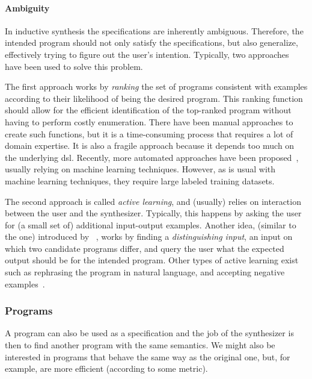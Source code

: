\paragraph{Ambiguity}
\label{sec:ambiguity}

In inductive synthesis the specifications are inherently ambiguous.
Therefore, the intended program should not only satisfy the specifications,
but also generalize, effectively trying to figure out the user's intention.
Typically, two approaches have been used to solve this problem.

The first approach works by \textit{ranking} the set of programs consistent with
examples according to their likelihood of being the desired program.
This ranking function should allow for the efficient identification of the
top-ranked program without having to perform costly enumeration.
There have been manual approaches to create such functions, but it is a
time-consuming process that requires a lot of domain expertise.
It is also a fragile approach because it depends too much on the underlying
\gls{dsl}.
Recently, more automated approaches have been proposed~\cite{Singh:ranking:2015,
  Ramsey:2017:LTL}, usually relying on machine learning techniques.
However, as is usual with machine learning techniques, they require large
labeled training datasets.

The second approach is called \textit{active learning}, and (usually) relies
on interaction between the user and the synthesizer.
Typically, this happens by asking the user for (a small set of) additional
input-output examples.
Another idea, (similar to the one) introduced by
\citeauthor{Jha:oracle:2010}~\cite{Jha:oracle:2010}, works by finding a
\textit{distinguishing input}, an input on which two candidate programs differ,
and query the user what the expected output should be for the intended program.
Other types of active learning exist such as rephrasing the program in natural
language, and accepting negative examples~\cite{Frankle:2016:EST}.

\subsubsection{Programs}
\label{sec:programs}

A program can also be used as a specification and the job of the synthesizer is
then to find another program with the same semantics.
We might also be interested in programs that behave the same way as the original
one, but, for example, are more efficient (according to some metric).

